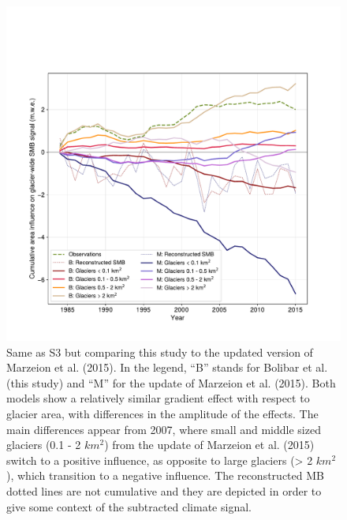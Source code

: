{\begin{figure}[h]
\centering
\includegraphics[width=14cm]{Figures/past/Figure_S4.pdf}
\captionsetup{justification=centering}
\caption{Same as S3 but comparing this study to the updated version of Marzeion et al. (2015). In the legend, “B” stands for Bolibar et al. (this study) and “M” for the update of Marzeion et al. (2015). Both models show a relatively similar gradient effect with respect to glacier area, with differences in the amplitude of the effects. The main differences appear from 2007, where small and middle sized glaciers (0.1 - 2 $km^{2}$) from the update of Marzeion et al. (2015) switch to a positive influence, as opposite to large glaciers (> 2 $km^{2}$), which transition to a negative influence. The reconstructed MB dotted lines are not cumulative and they are depicted in order to give some context of the subtracted climate signal.}
\label{past:figS4}
\end{figure}


}
